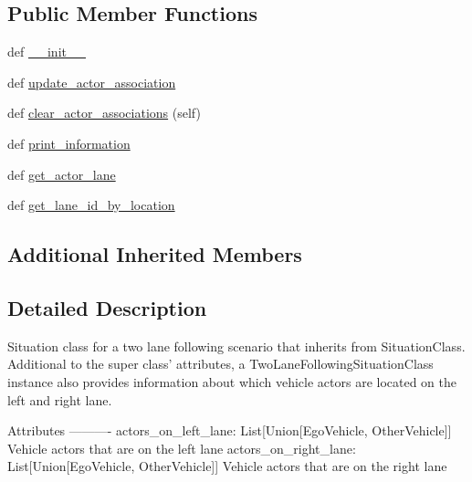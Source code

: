 \subsection*{Public Member Functions}
\begin{DoxyCompactItemize}
\item 
def \hyperlink{classimplementation_1_1actor__situation__class__detection_1_1situation__class_1_1_two_lane_following_situation_class_a15aee61039ea4a5a641c28a6d2afa7af}{\+\_\+\+\_\+init\+\_\+\+\_\+}
\item 
def \hyperlink{classimplementation_1_1actor__situation__class__detection_1_1situation__class_1_1_two_lane_following_situation_class_a4c3480d6a606fcbafb5de3449a04cb57}{update\+\_\+actor\+\_\+association}
\item 
def \hyperlink{classimplementation_1_1actor__situation__class__detection_1_1situation__class_1_1_two_lane_following_situation_class_a12f727ba21c4b086d50738a3663da044}{clear\+\_\+actor\+\_\+associations} (self)
\item 
def \hyperlink{classimplementation_1_1actor__situation__class__detection_1_1situation__class_1_1_two_lane_following_situation_class_a52414ba1eea10c65fad030a856a2e210}{print\+\_\+information}
\item 
def \hyperlink{classimplementation_1_1actor__situation__class__detection_1_1situation__class_1_1_two_lane_following_situation_class_ad7e7971b4f64c6afa2cc1c3cf65ab376}{get\+\_\+actor\+\_\+lane}
\item 
def \hyperlink{classimplementation_1_1actor__situation__class__detection_1_1situation__class_1_1_two_lane_following_situation_class_a687281c48350c369238ebc2990cf30cf}{get\+\_\+lane\+\_\+id\+\_\+by\+\_\+location}
\end{DoxyCompactItemize}
\subsection*{Additional Inherited Members}


\subsection{Detailed Description}
\begin{DoxyVerb}Situation class for a two lane following scenario that inherits from SituationClass. Additional to the super
class' attributes, a TwoLaneFollowingSituationClass instance also provides information about which vehicle actors
are located on the left and right lane.

Attributes
----------
actors_on_left_lane: List[Union[EgoVehicle, OtherVehicle]]
    Vehicle actors that are on the left lane
actors_on_right_lane: List[Union[EgoVehicle, OtherVehicle]]
    Vehicle actors that are on the right lane
\end{DoxyVerb}
 


